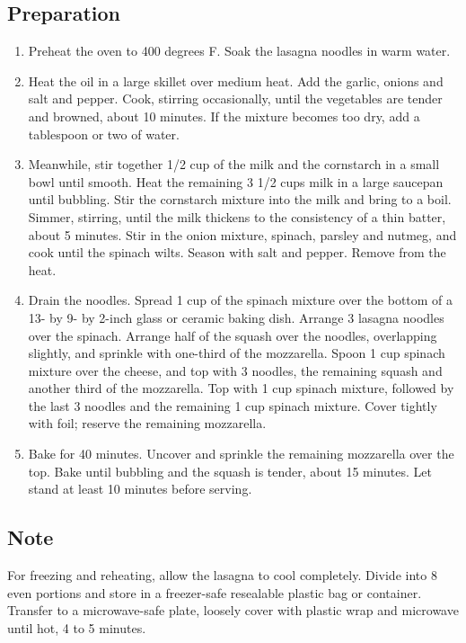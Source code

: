 \subsection{Preparation}
\begin{enumerate}
    \item Preheat the oven to 400 degrees F. Soak the lasagna noodles in warm water.
    \item Heat the oil in a large skillet over medium heat. Add the garlic, onions and salt and pepper. Cook, stirring occasionally, until the vegetables are tender and browned, about 10 minutes. If the mixture becomes too dry, add a tablespoon or two of water.
    \item Meanwhile, stir together 1/2 cup of the milk and the cornstarch in a small bowl until smooth. Heat the remaining 3 1/2 cups milk in a large saucepan until bubbling. Stir the cornstarch mixture into the milk and bring to a boil. Simmer, stirring, until the milk thickens to the consistency of a thin batter, about 5 minutes. Stir in the onion mixture, spinach, parsley and nutmeg, and cook until the spinach wilts. Season with salt and pepper. Remove from the heat.
    \item Drain the noodles. Spread 1 cup of the spinach mixture over the bottom of a 13- by 9- by 2-inch glass or ceramic baking dish. Arrange 3 lasagna noodles over the spinach. Arrange half of the squash over the noodles, overlapping slightly, and sprinkle with one-third of the mozzarella. Spoon 1 cup spinach mixture over the cheese, and top with 3 noodles, the remaining squash and another third of the mozzarella. Top with 1 cup spinach mixture, followed by the last 3 noodles and the remaining 1 cup spinach mixture. Cover tightly with foil; reserve the remaining mozzarella.
    \item Bake for 40 minutes. Uncover and sprinkle the remaining mozzarella over the top. Bake until bubbling and the squash is tender, about 15 minutes. Let stand at least 10 minutes before serving.
\end{enumerate}

\subsection{Note}
For freezing and reheating, allow the lasagna to cool completely. Divide into 8 even portions and store in a freezer-safe resealable plastic bag or container. Transfer to a microwave-safe plate, loosely cover with plastic wrap and microwave until hot, 4 to 5 minutes.

